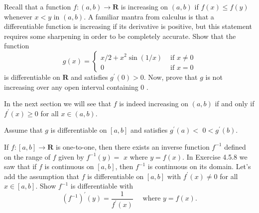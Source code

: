 \begin{exercise}
  Recall that a function $f:(a, b) \rightarrow \mathbf{R}$ is increasing on $(a, b)$ if $f(x) \leq f(y)$ whenever $x<y$ in $(a, b)$. A familiar mantra from calculus is that a differentiable function is increasing if its derivative is positive, but this statement requires some sharpening in order to be completely accurate.
  Show that the function
  $$
  g(x)= \begin{cases}x / 2+x^{2} \sin (1 / x) & \text { if } x \neq 0 \\ 0 & \text { if } x=0\end{cases}
  $$
  is differentiable on $\mathbf{R}$ and satisfies $g^{\prime}(0)>0$. Now, prove that $g$ is not increasing over any open interval containing 0 .

  In the next section we will see that $f$ is indeed increasing on $(a, b)$ if and only if $f^{\prime}(x) \geq 0$ for all $x \in(a, b)$.
\end{exercise}
\begin{solution}
  \TODO
\end{solution}

\begin{exercise}
  Assume that $g$ is differentiable on $[a, b]$ and satisfies $g^{\prime}(a)<$ $0<g^{\prime}(b)$.
\end{exercise}
\begin{solution}
  \TODO
\end{solution}

\begin{exercise}
  If $f:[a, b] \rightarrow \mathbf{R}$ is one-to-one, then there exists an inverse function $f^{-1}$ defined on the range of $f$ given by $f^{-1}(y)=$ $x$ where $y=f(x)$. In Exercise 4.5.8 we saw that if $f$ is continuous on $[a, b]$, then $f^{-1}$ is continuous on its domain. Let's add the assumption that $f$ is differentiable on $[a, b]$ with $f^{\prime}(x) \neq 0$ for all $x \in[a, b]$. Show $f^{-1}$ is differentiable with
  $$
  \left(f^{-1}\right)^{\prime}(y)=\frac{1}{f^{\prime}(x)} \quad \text { where } y=f(x) .
  $$
\end{exercise}
\begin{solution}
  \TODO
\end{solution}
